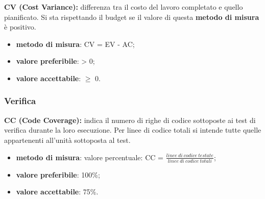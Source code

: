 \textbf{CV (Cost Variance):} differenza tra il costo del lavoro completato e quello pianificato. Si sta rispettando il budget se il valore di questa \textbf{metodo di misura} 
è positivo.
\begin{itemize}
    \item \textbf{metodo di misura}: CV = EV - AC;
    \item \textbf{valore preferibile}: > 0;
    \item \textbf{valore accettabile}: $\geq$ 0.
\end{itemize}
\subsubsection{Verifica}
\textbf{CC (Code Coverage):} indica il numero di righe di codice sottoposte ai test di verifica durante la loro esecuzione. Per linee di codice totali 
si intende tutte quelle appartenenti all'unità sottoposta al test.
\begin{itemize}
    \item \textbf{metodo di misura}: valore percentuale: CC = $\frac{linee \ di \ codice \ testate}{linee \ di \ codice \ totali}$;
    \item \textbf{valore preferibile}: 100\%;
    \item \textbf{valore accettabile}: 75\%.
\end{itemize}
